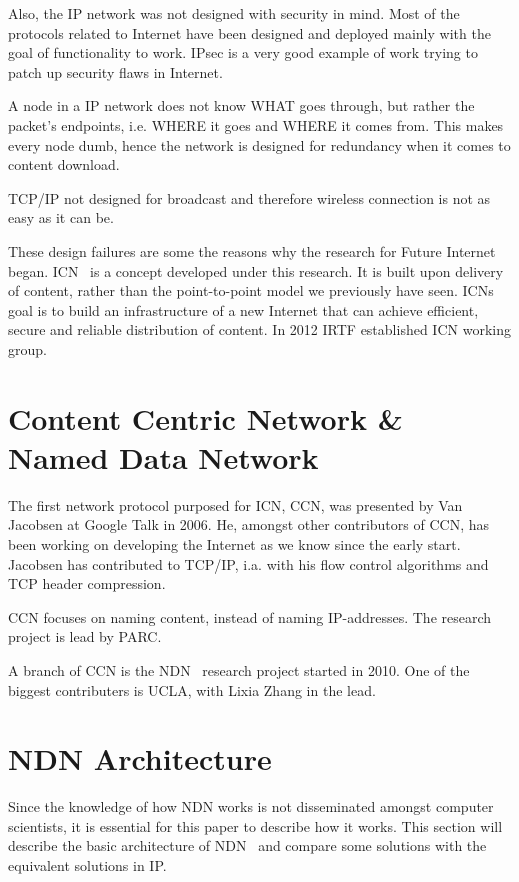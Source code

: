 Also, the \gls{IP} network was not designed with security in mind. 
Most of the protocols related to Internet have been designed and deployed mainly with the goal of functionality to work.
\gls{IPsec} is a very good example of work trying to patch up security flaws in Internet.

A node in a \gls{IP} network does not know WHAT goes through, but rather the packet's endpoints, i.e. WHERE it goes and WHERE it comes from. 
This makes every node dumb, hence the network is designed for redundancy when it comes to content download.

\gls{TCP}/\gls{IP} not designed for broadcast and therefore wireless connection is not as easy as it can be.

These design failures are some the reasons why the research for Future Internet began.  
\gls{ICN}~\cite{DBLP:journals/cm/AhlgrenDIKO12} is a concept developed under this research.
It is built upon delivery of content, rather than the point-to-point model we previously have seen.
\gls{ICN}s goal is to build an infrastructure of a new Internet that can achieve efficient, secure and reliable distribution of content.
In 2012 \gls{IRTF} established \gls{ICN} working group.


\section{Content Centric Network \& Named Data Network}\label{chp2:sec:icn}
The first network protocol purposed for \gls{ICN}, \gls{CCN}, was presented by Van Jacobsen at Google Talk in 2006. 
He, amongst other contributors of \gls{CCN}, has been working on developing the Internet as we know since the early start.
Jacobsen has contributed to \gls{TCP}/\gls{IP}, i.a. with his flow control algorithms and \gls{TCP} header compression. 

\gls{CCN} focuses on naming content, instead of naming \gls{IP}-addresses. 
The research project is lead by \gls{PARC}.

A branch of \gls{CCN} is the \gls{NDN}~\cite{DBLP:journals/ccr/0001ABJcCPWZ14} research project started in 2010.
One of the biggest contributers is \gls{UCLA}, with Lixia Zhang in the lead.

\section{NDN Architecture}\label{chp2:sec:ndn_architecture}
Since the knowledge of how \gls{NDN} works is not disseminated amongst computer scientists, it is essential for this paper to describe how it works.
This section will describe the basic architecture of \gls{NDN}~\cite{NDN-0021} and compare some solutions with the equivalent solutions in \gls{IP}.

